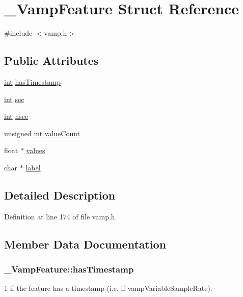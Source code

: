\hypertarget{struct___vamp_feature}{}\section{\+\_\+\+Vamp\+Feature Struct Reference}
\label{struct___vamp_feature}


{\ttfamily \#include $<$vamp.\+h$>$}

\subsection*{Public Attributes}
\begin{DoxyCompactItemize}
\item 
\hyperlink{xmltok_8h_a5a0d4a5641ce434f1d23533f2b2e6653}{int} \hyperlink{struct___vamp_feature_abe6aa7a08185beeb9deca2d08d99859f}{has\+Timestamp}
\item 
\hyperlink{xmltok_8h_a5a0d4a5641ce434f1d23533f2b2e6653}{int} \hyperlink{struct___vamp_feature_a31f0b57050e33d082692536097953d9c}{sec}
\item 
\hyperlink{xmltok_8h_a5a0d4a5641ce434f1d23533f2b2e6653}{int} \hyperlink{struct___vamp_feature_a8874cb23600c6b10ca6e8a40920d999e}{nsec}
\item 
unsigned \hyperlink{xmltok_8h_a5a0d4a5641ce434f1d23533f2b2e6653}{int} \hyperlink{struct___vamp_feature_ab1ce7c8a2b489e9b0694a967497a29fd}{value\+Count}
\item 
float $\ast$ \hyperlink{struct___vamp_feature_ae4030f941ddb2bab8bc147b88e1f1c15}{values}
\item 
char $\ast$ \hyperlink{struct___vamp_feature_a6662b7489a7890cae713bf4e8f6d52cd}{label}
\end{DoxyCompactItemize}


\subsection{Detailed Description}


Definition at line 174 of file vamp.\+h.



\subsection{Member Data Documentation}
\subsubsection[{\texorpdfstring{has\+Timestamp}{hasTimestamp}}]{ \+\_\+\+Vamp\+Feature\+::has\+Timestamp}\hypertarget{struct___vamp_feature_abe6aa7a08185beeb9deca2d08d99859f}{}\label{struct___vamp_feature_abe6aa7a08185beeb9deca2d08d99859f}
1 if the feature has a timestamp (i.\+e. if vamp\+Variable\+Sample\+Rate). 

